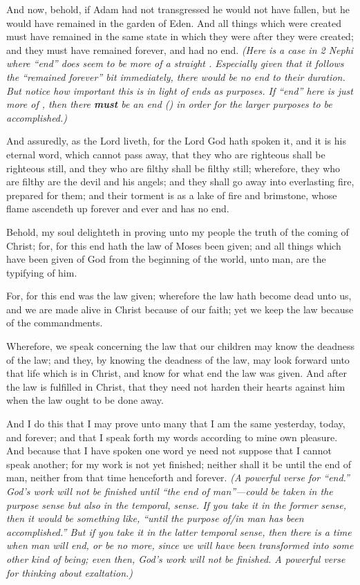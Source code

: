 \begin{compactdesc}
			\item[2 Nephi 2:22] And now, behold, if Adam had not transgressed he would not have fallen, but he would have remained in the garden of Eden. And all things which were created must have remained in the same state in which they were after they were created; and they must have remained forever, and had no end. \textit{(Here is a case in 2 Nephi where ``end'' does seem to be more of a straight . Especially given that it follows the ``remained forever'' bit immediately, there would be no end to their duration. But notice how important this is in light of ends as purposes. If ``end'' here is just more of , then there \textbf{must} be an end () in order for the larger purposes to be accomplished.)}
			\item[2 Nephi 9:16] And assuredly, as the Lord liveth, for the Lord God hath spoken it, and it is his eternal word, which cannot pass away, that they who are righteous shall be righteous still, and they who are filthy shall be filthy still; wherefore, they who are filthy are the devil and his angels; and they shall go away into everlasting fire, prepared for them; and their torment is as a lake of fire and brimstone, whose flame ascendeth up forever and ever and has no end.
			\item[2 Nephi 11:4] Behold, my soul delighteth in proving unto my people the truth of the coming of Christ; for, for this end hath the law of Moses been given; and all things which have been given of God from the beginning of the world, unto man, are the typifying of him.
			\item[2 Nephi 25:25] For, for this end was the law given; wherefore the law hath become dead unto us, and we are made alive in Christ because of our faith; yet we keep the law because of the commandments.
			\item[2 Nephi 25:27] Wherefore, we speak concerning the law that our children may know the deadness of the law; and they, by knowing the deadness of the law, may look forward unto that life which is in Christ, and know for what end the law was given. And after the law is fulfilled in Christ, that they need not harden their hearts against him when the law ought to be done away.
			\item[2 Nephi 29:9] And I do this that I may prove unto many that I am the same yesterday, today, and forever; and that I speak forth my words according to mine own pleasure. And because that I have spoken one word ye need not suppose that I cannot speak another; for my work is not yet finished; neither shall it be until the end of man, neither from that time henceforth and forever. \textit{(A powerful verse for ``end.'' God's work will not be finished until ``the end of man''---could be taken in the purpose sense but also in the temporal,  sense. If you take it in the former sense, then it would be something like, ``until the purpose of/in man has been accomplished.'' But if you take it in the latter temporal sense, then there is a time when man will end, or be no more, since we will have been transformed into some other kind of being; even then, God's work will not be finished. A powerful verse for thinking about exaltation.)}

\end{compactdesc}
